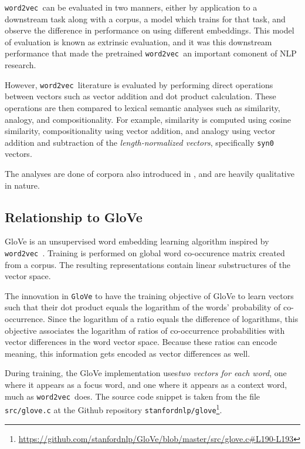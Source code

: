 \documentclass[11pt]{book}
\newcommand{\wtov}{\texttt{word2vec }}
\begin{document}
\wtov can be evaluated in two manners, either by application to a downstream
task along with a corpus, a model which trains for that task, and observe the
difference in performance on using different embeddings. This model of
evaluation is known as extrinsic evaluation, and it was this downstream
performance that made the pretrained \wtov an important comonent of NLP
research.

However, \wtov literature is evaluated by performing direct operations between
vectors such as vector addition and dot product calculation. These operations
are then compared to lexical semantic analyses such as similarity, analogy, and
compositionality. For example, similarity is computed using cosine similarity,
compositionality using vector addition, and analogy using vector addition
and subtraction of the \textit{length-normalized vectors}, specifically
\texttt{syn0} vectors.

The analyses are done of corpora also introduced in
\cite{mikolov2013distributed}, and are heavily qualitative in nature.

\subsection{Relationship to GloVe}

GloVe \cite{pennington2014glove} is an unsupervised word embedding learning
algorithm inspired by \wtov. Training is performed on global word co-occurence
matrix created from a corpus. The resulting representations contain linear
substructures of the vector space.

The innovation in \texttt{GloVe} to have the training objective of GloVe to learn
vectors such that their dot product equals the logarithm of the words'
probability of co-occurrence. Since the logarithm of a ratio
equals the difference of logarithms, this objective associates the logarithm
of ratios of co-occurrence probabilities with vector differences in the word
vector space. Because these ratios can encode meaning, this
information gets encoded as vector differences as well.

During training, the GloVe implementation uses\emph{two vectors for each word},
one where it appears as a focus word, and one where it appears as a context
word, much as \wtov does. The source code snippet is taken from the file
\texttt{src/glove.c} at the Github repository
\texttt{stanfordnlp/glove}\footnote{\url{https://github.com/stanfordnlp/GloVe/blob/master/src/glove.c\#L190-L193}}.
\end{document}
